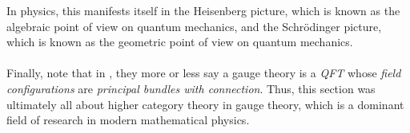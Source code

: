 In physics, this manifests itself in the Heisenberg picture, which is known as the algebraic point of view on quantum mechanics, and the Schr\"odinger picture, which is known as the geometric point of view on quantum mechanics.
\\\\
Finally, note that in \cite{wiki-nlab0000}, they more or less say a gauge theory is a \textit{QFT} whose \textit{field configurations} are \textit{principal bundles with connection}.
Thus, this section was ultimately all about higher category theory in gauge theory, which is a dominant field of research in modern mathematical physics.

